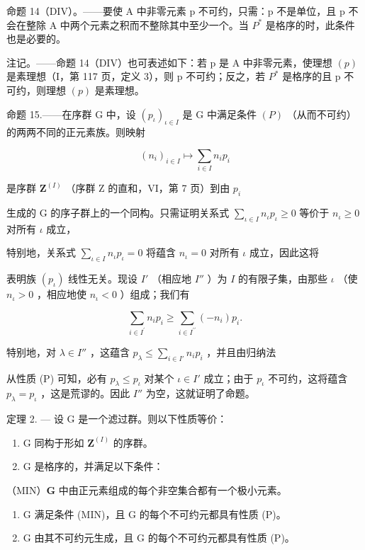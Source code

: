 命题 14（DIV）。——要使 A 中非零元素 p 不可约，只需：p 不是单位，且 p 不会在整除 A 中两个元素之积而不整除其中至少一个。当 \(P^{*}\) 是格序的时，此条件也是必要的。

注记。——命题 14（DIV）也可表述如下：若 p 是 A 中非零元素，使理想 \((p)\) 是素理想（I，第 117 页，定义 3），则 p 不可约；反之，若 \(P^{*}\) 是格序的且 p 不可约，则理想 \((p)\) 是素理想。

命题 15.——在序群 G 中，设 \((p_{\iota})_{\iota \in I}\) 是 G 中满足条件 \((P)\) （从而不可约）的两两不同的正元素族。则映射

\[
(n _ {i}) _ {i \in I} \mapsto \sum_ {i \in I} n _ {i} p _ {i}
\]

是序群 \(\mathbf{Z}^{(I)}\) （序群 Z 的直和，VI，第 7 页）到由 \(p_{i}\)

生成的 G 的序子群上的一个同构。只需证明关系式 \(\sum_{\iota \in I} n_{\iota} p_{\iota} \geqslant 0\) 等价于 \(n_{\iota} \geqslant 0\) 对所有 \(\iota\) 成立，

特别地，关系式 \(\sum_{\iota \in I} n_{\iota} p_{\iota} = 0\) 将蕴含 \(n_{\iota} = 0\) 对所有 \(\iota\) 成立，因此这将

表明族 \((p_{\iota})\) 线性无关。现设 \(I'\) （相应地 \(I''\) ）为 \(I\) 的有限子集，由那些 \(\iota\) （使 \(n_{\iota} > 0\) ，相应地使 \(n_{\iota} < 0\) ）组成；我们有

\[
\sum_ {i \in I ^ {\prime}} n _ {i} p _ {i} \geqslant \sum_ {i \in I ^ {\prime \prime}} (- n _ {i}) p _ {i}.
\]

特别地，对 \(\lambda \in I''\) ，这蕴含 \(p_{\lambda} \leqslant \sum_{i \in I'} n_i p_i\) ，并且由归纳法

从性质 (P) 可知，必有 \(p_{\lambda} \leqslant p_{\iota}\) 对某个 \(\iota \in I'\) 成立；由于 \(p_{\iota}\) 不可约，这将蕴含 \(p_{\lambda} = p_{\iota}\) ，这是荒谬的。因此 \(I''\) 为空，这就证明了命题。

定理 2. --- 设 G 是一个滤过群。则以下性质等价：

\begin{enumerate}
\def\labelenumi{\alph{enumi})}
\item
  G 同构于形如 \(\mathbf{Z}^{(I)}\) 的序群。
\item
  G 是格序的，并满足以下条件：
\end{enumerate}

（MIN）\(\mathbf{G}\) 中由正元素组成的每个非空集合都有一个极小元素。

\begin{enumerate}
\def\labelenumi{\alph{enumi})}
\setcounter{enumi}{2}
\item
  G 满足条件 (MIN)，且 G 的每个不可约元都具有性质 (P)。
\item
  G 由其不可约元生成，且 G 的每个不可约元都具有性质 (P)。
\end{enumerate}

